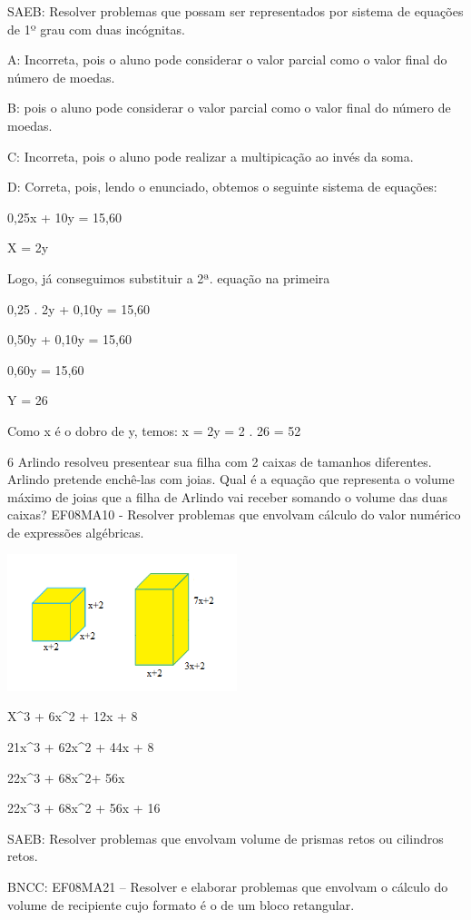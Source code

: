 {SAEB: Resolver problemas que possam ser representados por sistema de
equações de 1º grau com duas incógnitas.

A: Incorreta, pois o aluno pode considerar o valor parcial como o valor
final do número de moedas.

B: pois o aluno pode considerar o valor parcial como o valor final do
número de moedas.

C: Incorreta, pois o aluno pode realizar a multipicação ao invés da
soma.

D: Correta, pois, lendo o enunciado, obtemos o seguinte sistema de
equações:

0,25x + 10y = 15,60

X = 2y

Logo, já conseguimos substituir a 2ª. equação na primeira

0,25 . 2y + 0,10y = 15,60

0,50y + 0,10y = 15,60

0,60y = 15,60

Y = 26

Como x é o dobro de y, temos: x = 2y = 2 . 26 = 52

\num{6} Arlindo resolveu presentear sua filha com 2 caixas de tamanhos
diferentes. Arlindo pretende enchê-las com joias. Qual é a equação que
representa o volume máximo de joias que a filha de Arlindo vai receber
somando o volume das duas caixas? EF08MA10 - Resolver problemas que
envolvam cálculo do valor numérico de expressões algébricas.

\includegraphics[width=2.63333in,height=1.56545in]{./imgSAEB_8_MAT/media/image55.png}
\item X^3 + 6x^2 + 12x + 8
\item 21x^3 + 62x^2 + 44x + 8
\item 22x^3 + 68x^2+ 56x
\item 22x^3 + 68x^2 + 56x + 16

SAEB: Resolver problemas que envolvam volume de prismas retos ou
cilindros retos.

BNCC: EF08MA21 -- Resolver e elaborar problemas que envolvam o cálculo
do volume de recipiente cujo formato é o de um bloco retangular.

}
